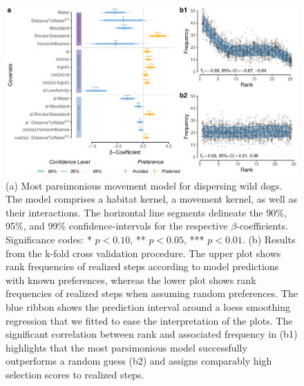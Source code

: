 \documentclass[abstract=on,10pt,a4paper,bibliography=totocnumbered]{article}
\begin{document}
\begin{figure}
  \begin{center}
    \includegraphics[width=\textwidth]{99_MovementModel}
    \caption{(a) Most parsimonious movement model for dispersing wild dogs. The
    model comprises a habitat kernel, a movement kernel, as well as their
    interactions. The horizontal line segments delineate the 90\%, 95\%, and
    99\% confidence-intervals for the respective \(\beta\)-coefficients.
    Significance codes: * \(p < 0.10\), ** \(p < 0.05\), *** \(p < 0.01\). (b)
    Results from the k-fold cross validation procedure. The upper plot shows
    rank frequencies of realized steps according to model predictions with known
    preferences, whereas the lower plot shows rank frequencies of realized steps
    when assuming random preferences. The blue ribbon shows the prediction
    interval around a loess smoothing regression that we fitted to ease the
    interpretation of the plots. The significant correlation between rank and
    associated frequency in (b1) highlights that the most parsimonious model
    successfully outperforms a random guess (b2) and assigns comparably high
    selection scores to realized steps.}
    \label{MovementModel}
  \end{center}
\end{figure}
\end{document}
